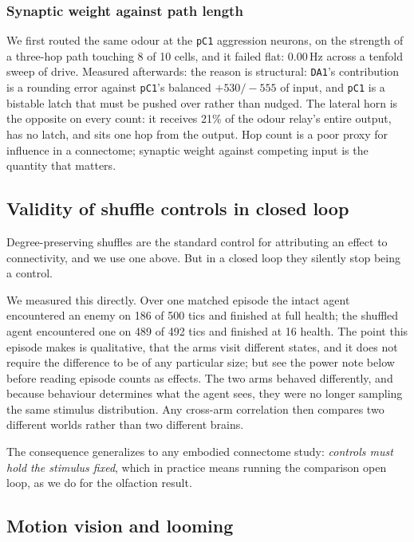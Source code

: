 \documentclass[10pt,twoside]{article}
\newcommand{\cell}[1]{\texttt{#1}}
\begin{document}
\subsubsection*{Synaptic weight against path length}
We first routed the same odour at the \cell{pC1} aggression neurons, on the
strength of a three-hop path touching 8 of 10 cells, and it failed flat:
0.00\,Hz across a tenfold sweep of drive. Measured afterwards: the reason is
structural: \cell{DA1}'s contribution is a rounding error against \cell{pC1}'s
balanced $+530/-555$ of input, and \cell{pC1} is a bistable latch that must be
pushed over rather than nudged. The lateral horn is the opposite on every
count: it receives 21\% of the odour relay's entire output, has no latch,
and sits one hop from the output. Hop count is a poor proxy for influence in a
connectome; synaptic weight against competing input is the quantity that
matters.

\subsection{Validity of shuffle controls in closed loop}
\label{sec:shuffle}

Degree-preserving shuffles are the standard control for attributing an effect
to connectivity, and we use one above. But in a closed loop they silently stop
being a control.

We measured this directly. Over one matched episode the intact agent
encountered an enemy on 186 of 500 tics and finished at full health; the
shuffled agent encountered one on 489 of 492 tics and finished at 16 health.
The point this episode makes is qualitative, that the arms visit different
states, and it does not require the difference to be of any particular
size; but see the power note below before reading episode counts as effects. The two arms
behaved differently, and because behaviour determines what the agent sees, they
were no longer sampling the same stimulus distribution. Any cross-arm
correlation then compares two different worlds rather than two different
brains.

The consequence generalizes to any embodied connectome study: \emph{controls
must hold the stimulus fixed}, which in practice means running the comparison
open loop, as we do for the olfaction result.

\subsection{Motion vision and looming}
\end{document}

